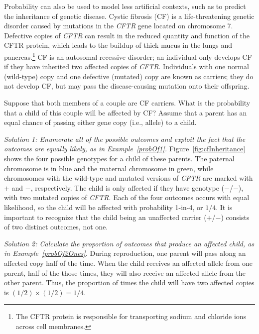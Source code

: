 Probability can also be used to model less artificial contexts, such as to predict the inheritance of genetic disease. Cystic fibrosis (CF) is a life-threatening genetic disorder caused by mutations in the \textit{CFTR} gene located on chromosome 7. Defective copies of \textit{CFTR} can result in the reduced quantity and function of the CFTR protein, which leads to the buildup of thick mucus in the lungs and pancreas.\footnote{The CFTR protein is responsible for transporting sodium and chloride ions across cell membranes.} CF is an autosomal recessive disorder; an individual only develops CF if they have inherited two affected copies of \textit{CFTR}. Individuals with one normal (wild-type) copy and one defective (mutated) copy are known as carriers; they do not develop CF, but may pass the disease-causing mutation onto their offspring.


\begin{example} {Suppose that both members of a couple are CF carriers. What is the probability that a child of this couple will be affected by CF? Assume that a parent has an equal chance of passing either gene copy (i.e., allele) to a child.}\label{CFInheritanceExample}

\textit{Solution 1: Enumerate all of the possible outcomes and exploit the fact that the outcomes are equally likely, as in Example~\ref{probOf1}.}  Figure~\ref{fig:cfInheritance} shows the four possible genotypes for a child of these parents. The paternal chromosome is in blue and the maternal chromosome in green, while chromosomes with the wild-type and mutated versions of \textit{CFTR} are marked with $+$ and $-$, respectively. The child is only affected if they have genotype ($-$/$-$), with two mutated copies of \textit{CFTR}. Each of the four outcomes occurs with equal likelihood, so the child will be affected with probability 1-in-4, or $1/4$.  It is important to recognize that the child being an unaffected carrier ($+$/$-$) consists of two distinct outcomes, not one. 

\textit{Solution 2:  Calculate the proportion of outcomes that produce an affected child, as in Example~\ref{probOf2Ones}.}  During reproduction, one parent will pass along an affected copy half of the time.  When the child receives an affected allele from one parent, half of the those times, they will also receive an affected allele from the other parent. Thus, the proportion of times the child will have two affected copies is $(1/2) \times (1/2) = 1/4$.
\end{example}

